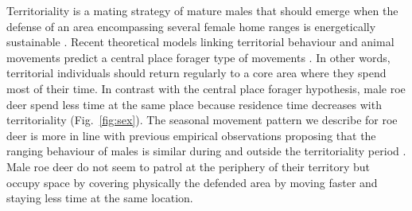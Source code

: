 \documentclass[a4paper,11pt]{article}
\begin{document}
Territoriality is a mating strategy of mature males that should emerge
when the defense of an area encompassing several female home ranges is
energetically sustainable \citep{emlen_ecology_1977}. Recent theoretical models linking territorial behaviour and animal movements predict a central place forager type of movements
\citep{potts_territorial_2012}. In other words, territorial individuals
should return regularly to a core area where they spend most of their
time. In contrast with the central place forager hypothesis, male roe
deer spend less time at the same place because residence time
decreases with territoriality (Fig.~\ref{fig:sex}). The seasonal movement pattern we describe for roe deer is more in line with previous empirical observations proposing that the ranging behaviour of males is similar during and outside the territoriality period \citep{andersen_mating_1998}. Male roe deer do not seem to patrol at the periphery of their territory but occupy space by covering physically the defended area by moving faster and staying less time at the same location.

\end{document}
